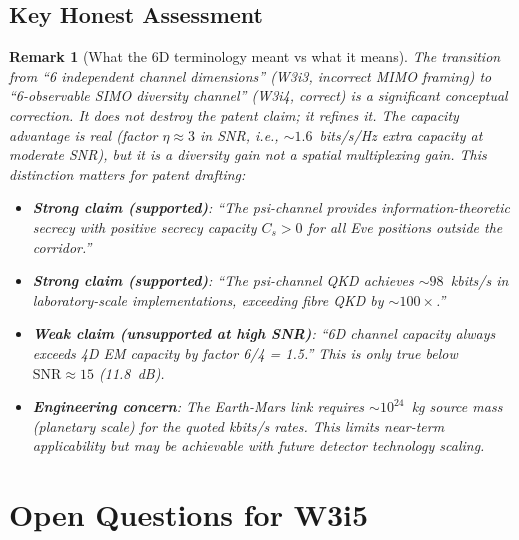 \documentclass[aps,prd,twocolumn,superscriptaddress,nofootinbib]{revtex4-2}
\newcommand{\SNR}{\mathrm{SNR}}
\newtheorem{remark}{Remark}
\begin{document}
\subsection{Key Honest Assessment}

\begin{remark}[What the 6D terminology meant vs what it means]
The transition from ``6 independent channel dimensions'' (W3i3, incorrect
MIMO framing) to ``6-observable SIMO diversity channel'' (W3i4, correct)
is a significant conceptual correction. It does \emph{not} destroy the
patent claim; it refines it. The capacity advantage is real (factor
$\eta \approx 3$ in SNR, i.e., $\sim 1.6$~bits/s/Hz extra capacity
at moderate SNR), but it is a diversity gain not a spatial multiplexing
gain. This distinction matters for patent drafting:

\begin{itemize}
\item \textbf{Strong claim (supported)}: ``The psi-channel provides
  information-theoretic secrecy with positive secrecy capacity $C_s > 0$
  for all Eve positions outside the corridor.''
\item \textbf{Strong claim (supported)}: ``The psi-channel QKD achieves
  $\sim 98$~kbits/s in laboratory-scale implementations, exceeding
  fibre QKD by $\sim 100\times$.''
\item \textbf{Weak claim (unsupported at high SNR)}: ``6D channel capacity
  always exceeds 4D EM capacity by factor 6/4 = 1.5.'' This is only true
  below $\SNR \approx 15$ (11.8~dB).
\item \textbf{Engineering concern}: The Earth-Mars link requires
  $\sim 10^{24}$~kg source mass (planetary scale) for the quoted kbits/s
  rates. This limits near-term applicability but may be achievable with
  future detector technology scaling.
\end{itemize}
\end{remark}

\section{Open Questions for W3i5}
\label{sec:open}
\end{document}
